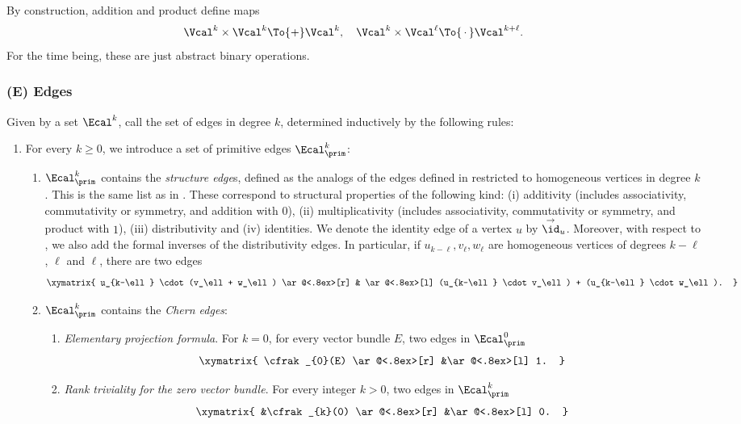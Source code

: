 By construction, addition and product define maps
\begin{equation}\label{eq:operations-vertices}
\Vcal^{k}\times\Vcal^{k}\To{+}\Vcal^{k},\quad \Vcal^{k}\times\Vcal^{\ell}\To{\,\cdot\,}\Vcal^{k+\ell}.
\end{equation}
For the time being, these are just abstract binary operations.

\subsubsection*{\textup{(E)} Edges}
Given by a set $\Ecal^k$, call the set of edges in degree $k$, determined inductively by the following rules:
\begin{enumerate}
\item For every $k\geq 0$, we introduce a set of primitive edges $\Ecal^k_\prim$:
\begin{enumerate}
\item \label{eq:structureedges} $\Ecal^k_\prim$ contains the \emph{structure edge}s, defined as the analogs of the edges defined in \cite[Volume I, Definition 3.1.6]{Johnson-Yau} restricted to homogeneous vertices in degree $k$. This is the same list as in \cite[]{Laplaza}. These correspond to structural properties of the following kind: (i) additivity (includes associativity, commutativity or symmetry, and addition with $0$), (ii) multiplicativity (includes associativity, commutativity or symmetry, and product with $1$), (iii) distributivity and (iv) identities. We denote the identity edge of a vertex $u$ by $\overset{\to}{\id}_u$. Moreover, with respect to \loccit, we also add the formal inverses of the distributivity edges. In particular, if $u_{k-\ell}, v_{\ell}, w_{\ell}$ are homogeneous vertices of degrees $k-\ell$, $\ell$ and $\ell$, there are two edges
\begin{displaymath}
\xymatrix{
u_{k-\ell} \cdot (v_\ell + w_\ell) \ar@<.8ex>[r] & \ar@<.8ex>[l] (u_{k-\ell} \cdot v_\ell) + (u_{k-\ell} \cdot w_\ell).
}
\end{displaymath}
\item $\Ecal^k_\prim$ contains the \emph{Chern edges}:
\begin{enumerate}
\item\label{item:formal-iso-1} \emph{Elementary projection formula}. For $k=0$, for every vector bundle $E$, two edges in $\Ecal_{\prim}^0$
\begin{displaymath}
\xymatrix{
\cfrak_{0}(E) \ar@<.8ex>[r] &\ar@<.8ex>[l] 1.
}
\end{displaymath}
\item\label{item:formal-iso-3} \emph{Rank triviality for the zero vector bundle}. For every integer $k > 0$, two edges in $\Ecal^k_{\prim}$
\begin{displaymath}
\xymatrix{
&\cfrak_{k}(0) \ar@<.8ex>[r] &\ar@<.8ex>[l] 0.
}
\end{displaymath}


\end{enumerate}
\end{enumerate}
\end{enumerate}
